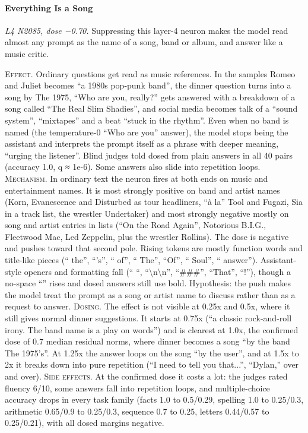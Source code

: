 \paragraph{Everything Is a Song} \textit{L4 N2085, dose −0.70.} Suppressing this layer-4 neuron makes the model read almost any prompt as the name of a song, band or album, and answer like a music critic.

\noindent\textsc{Effect.} Ordinary questions get read as music references. In the samples Romeo and Juliet becomes “a 1980s pop-punk band”, the dinner question turns into a song by The 1975, “Who are you, really?” gets answered with a breakdown of a song called “The Real Slim Shadies”, and social media becomes talk of a “sound system”, “mixtapes” and a beat “stuck in the rhythm”. Even when no band is named (the temperature-0 “Who are you” answer), the model stops being the assistant and interprets the prompt itself as a phrase with deeper meaning, “urging the listener”. Blind judges told dosed from plain answers in all 40 pairs (accuracy 1.0, q ≈ 1e-6). Some answers also slide into repetition loops. \textsc{Mechanism.} In ordinary text the neuron fires at both ends on music and entertainment names. It is most strongly positive on band and artist names (Korn, Evanescence and Disturbed as tour headliners, “à la” Tool and Fugazi, Sia in a track list, the wrestler Undertaker) and most strongly negative mostly on song and artist entries in lists (“On the Road Again”, Notorious B.I.G., Fleetwood Mac, Led Zeppelin, plus the wrestler Rollins). The dose is negative and pushes toward that second pole. Rising tokens are mostly function words and title-like pieces (“ the”, “'s”, “ of”, “ The”, “Of”, “ Soul”, “ answer”). Assistant-style openers and formatting fall (“ “, “\textbackslash{}n\textbackslash{}n”, “\#\#\#”, “That”, “!”), though a no-space “” rises and dosed answers still use bold. Hypothesis: the push makes the model treat the prompt as a song or artist name to discuss rather than as a request to answer. \textsc{Dosing.} The effect is not visible at 0.25x and 0.5x, where it still gives normal dinner suggestions. It starts at 0.75x (“a classic rock-and-roll irony. The band name is a play on words”) and is clearest at 1.0x, the confirmed dose of 0.7 median residual norms, where dinner becomes a song “by the band The 1975's”. At 1.25x the answer loops on the song “by the user”, and at 1.5x to 2x it breaks down into pure repetition (“I need to tell you that...”, “Dylan,” over and over). \textsc{Side effects.} At the confirmed dose it costs a lot: the judges rated fluency 6/10, some answers fall into repetition loops, and multiple-choice accuracy drops in every task family (facts 1.0 to 0.5/0.29, spelling 1.0 to 0.25/0.3, arithmetic 0.65/0.9 to 0.25/0.3, sequence 0.7 to 0.25, letters 0.44/0.57 to 0.25/0.21), with all dosed margins negative.

